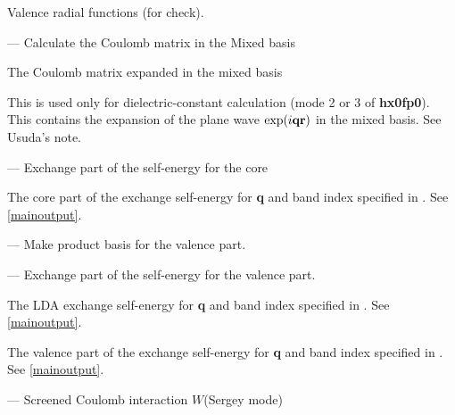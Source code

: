  Valence radial functions (for check).


--- Calculate the Coulomb matrix in the Mixed basis

\infiles




\outfiles

 The Coulomb matrix expanded in the mixed basis

This is used only for dielectric-constant calculation (mode 2 or 3 of {\bf hx0fp0}).
This contains the expansion of the plane wave $\exp( i{\bf q r})$ in the mixed basis.
See Usuda's note.


--- Exchange part of the self-energy for the core

\infiles










\outfiles

The core part of the exchange self-energy for {\bf q} and band index specified in . 
See \ref{mainoutput}.



--- Make product basis for the valence part.

--- Exchange part of the self-energy for the valence part.

\outfiles

  The LDA exchange self-energy for {\bf q} and band index specified in . 
See \ref{mainoutput}.

 The valence part of the exchange self-energy for {\bf q} and band index specified in . See \ref{mainoutput}.



--- Screened Coulomb interaction $W$(Sergey mode)

